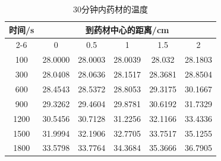 \documentclass[withoutpreface,bwprint]{cumcm_thesis}
\begin{document}
\begin{table}[htbp]
    \centering
    \caption{30分钟内药材的温度}
    \label{tab:temp}
    \renewcommand{\arraystretch}{1.5} %
    \setlength{\tabcolsep}{10pt} %
    \begin{tabular}{|c|c|c|c|c|c|}
        \hline
        \multirow{2}{*}{时间/s} & \multicolumn{5}{c|}{到药材中心的距离/cm} \\
        \cline{2-6}
         & 0 & 0.5 & 1 & 1.5 & 2 \\
        \hline
        100 & 28.0000 & 28.0003 & 28.0039 & 28.032 & 28.1803 \\
        \hline
        300 & 28.0408 & 28.0636 & 28.1517 & 28.3681 & 28.8504 \\
        \hline
        600 & 28.4543 & 28.5372 & 28.8053 & 29.3175 & 30.1667 \\
        \hline
        900 & 29.3262 & 29.4604 & 29.8781 & 30.6192 & 31.7329 \\
        \hline
        1200 & 30.5456 & 30.7128 & 31.2256 & 32.1166 & 33.4336 \\
        \hline
        1500 & 31.9994 & 32.1906 & 32.7705 & 33.7517 & 35.1255 \\
        \hline
        1800 & 33.5798 & 33.7764 & 34.3684 & 35.3666 & 36.7905 \\
        \hline
    \end{tabular}
\end{table}
\end{document}
